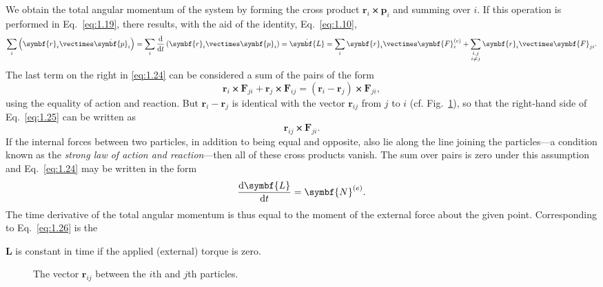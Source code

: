 We obtain the total angular momentum of the system by forming the cross product \(\symbf{r}_i\vectimes\symbf{p}_i\) and summing over \(i\). If this operation is performed in Eq.~\eqref{eq:1.19}, there results, with the aid of the identity, Eq.~\eqref{eq:1.10},
\begin{equation}
    \sum_i\left(\symbf{r}_i\vectimes\dot{\symbf{p}}_i\right)=\sum_i\odv*{\left(\symbf{r}_i\vectimes\symbf{p}_i\right)}{t}=\dot{\symbf{L}}=\sum_i\symbf{r}_i\vectimes\symbf{F}_i^{\left(e\right)}+\sum_{\substack{i,j\\i\ne j}}\symbf{r}_i\vectimes\symbf{F}_{ji}.\label{eq:1.24}
\end{equation}
The last term on the right in \eqref{eq:1.24} can be considered a sum of the pairs of the form
\begin{equation}
    \symbf{r}_i\vectimes\symbf{F}_{ji}+\symbf{r}_j\vectimes\symbf{F}_{ij}=\left(\symbf{r}_i-\symbf{r}_j\right)\vectimes\symbf{F}_{ji},\label{eq:1.25}
\end{equation}
using the equality of action and reaction. But \(\symbf{r}_i-\symbf{r}_j\) is identical with the vector \(\symbf{r}_{ij}\) from \(j\) to \(i\) (cf. Fig.~\ref{fig:1.2}), so that the right-hand side of Eq.~\eqref{eq:1.25} can be written as
\begin{equation*}
    \symbf{r}_{ij}\vectimes\symbf{F}_{ji}.
\end{equation*}
If the internal forces between two particles, in addition to being equal and opposite, also lie along the line joining the particles---a condition known as the \emph{strong law of action and reaction}---then all of these cross products vanish. The sum over pairs is zero under this assumption and Eq.~\eqref{eq:1.24} may be written in the form
\begin{equation}
    \odv{\symbf{L}}{t}=\symbf{N}^{\left(e\right)}.\label{eq:1.26}
\end{equation}
The time derivative of the total angular momentum is thus equal to the moment of the external force about the given point. Corresponding to Eq.~\eqref{eq:1.26} is the
\begin{theorem}
    \(\symbf{L}\) is constant in time if the applied (external) torque is zero.
\end{theorem}

\begin{figure}[htbp]
    \centering
    \caption{The vector \(\symbf{r}_{ij}\) between the \(i\)th and \(j\)th particles.}
    \label{fig:1.2}
\end{figure}

